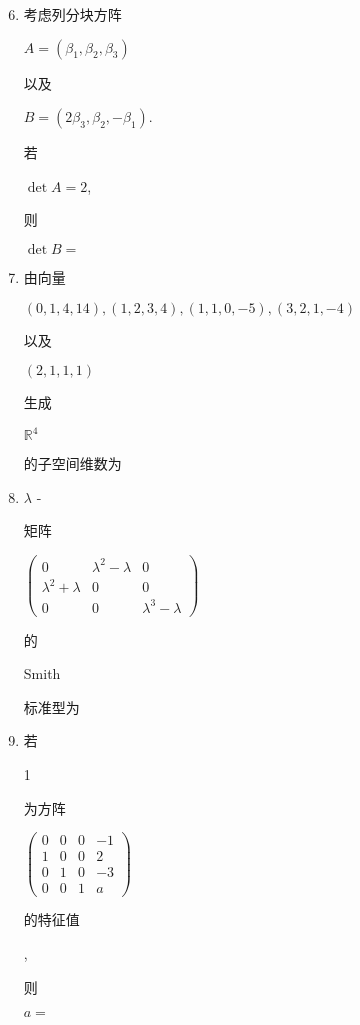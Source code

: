 \documentclass[10pt]{article}
\begin{document}
\begin{enumerate}
  \setcounter{enumi}{5}
  \item \begin{CJK}{UTF8}{mj}考虑列分块方阵\end{CJK} $A=\left(\beta_{1}, \beta_{2}, \beta_{3}\right)$ \begin{CJK}{UTF8}{mj}以及\end{CJK} $B=\left(2 \beta_{3}, \beta_{2},-\beta_{1}\right)$. \begin{CJK}{UTF8}{mj}若\end{CJK} $\operatorname{det} A=2$, \begin{CJK}{UTF8}{mj}则\end{CJK} $\operatorname{det} B=$

  \item \begin{CJK}{UTF8}{mj}由向量\end{CJK} $(0,1,4,14),(1,2,3,4),(1,1,0,-5),(3,2,1,-4)$ \begin{CJK}{UTF8}{mj}以及\end{CJK} $(2,1,1,1)$ \begin{CJK}{UTF8}{mj}生成\end{CJK} $\mathbb{R}^{4}$ \begin{CJK}{UTF8}{mj}的子空间维数为\end{CJK}

  \item $\lambda$ - \begin{CJK}{UTF8}{mj}矩阵\end{CJK} $\left(\begin{array}{ccc}0 & \lambda^{2}-\lambda & 0 \\ \lambda^{2}+\lambda & 0 & 0 \\ 0 & 0 & \lambda^{3}-\lambda\end{array}\right)$ \begin{CJK}{UTF8}{mj}的\end{CJK} Smith \begin{CJK}{UTF8}{mj}标准型为\end{CJK}

  \item \begin{CJK}{UTF8}{mj}若\end{CJK} 1 \begin{CJK}{UTF8}{mj}为方阵\end{CJK} $\left(\begin{array}{cccc}0 & 0 & 0 & -1 \\ 1 & 0 & 0 & 2 \\ 0 & 1 & 0 & -3 \\ 0 & 0 & 1 & a\end{array}\right)$ \begin{CJK}{UTF8}{mj}的特征值\end{CJK}, \begin{CJK}{UTF8}{mj}则\end{CJK} $a=$

\end{enumerate}
\end{document}
